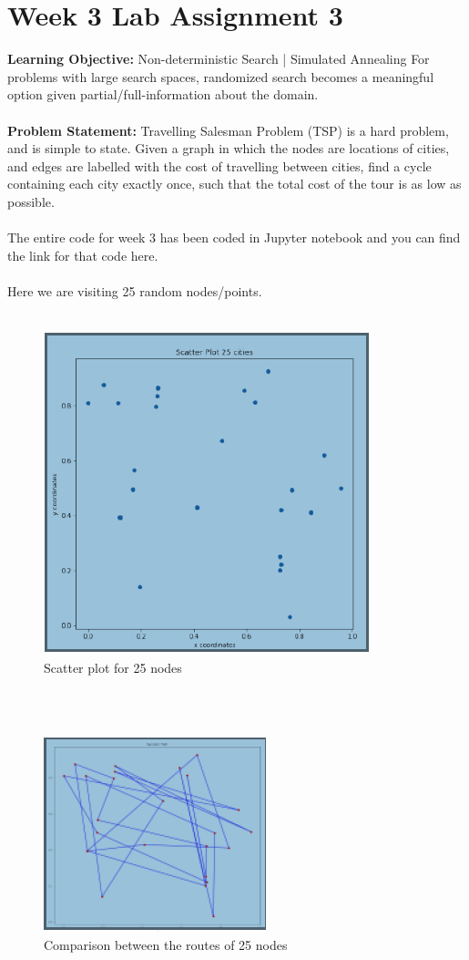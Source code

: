 \documentclass[conference]{IEEEtran}
\begin{document}
\section{Week 3 Lab Assignment 3}
\textbf{Learning Objective:} 
Non-deterministic Search | Simulated
Annealing For problems with large search spaces, randomized search becomes a meaningful option given partial/full-information about the domain.
\\
\\
\textbf{Problem Statement:}
Travelling Salesman Problem (TSP) is a hard problem, and is simple to state. Given a graph in which the nodes are locations of cities, and edges are labelled with the cost of travelling between cities, find a cycle containing each city exactly once, such that the total cost of the tour is as low as possible.
\\
\\
The entire code for week 3 has been coded in Jupyter notebook and you can find the link for that code here.
\href{}{}
\\
\\
Here we are visiting 25 random nodes/points.
\\
\\
\begin{figure}[htbp]
\centerline{\includegraphics[scale=0.8]{ran.png}}
\caption{Scatter plot for 25 nodes}
\label{fig}
\end{figure}
\\
\\
\begin{figure}[htbp]
\centerline{\includegraphics[scale=0.75]{sct.png}}
\caption{Comparison between the routes of 25 nodes}
\label{fig}
\end{figure}
\end{document}
